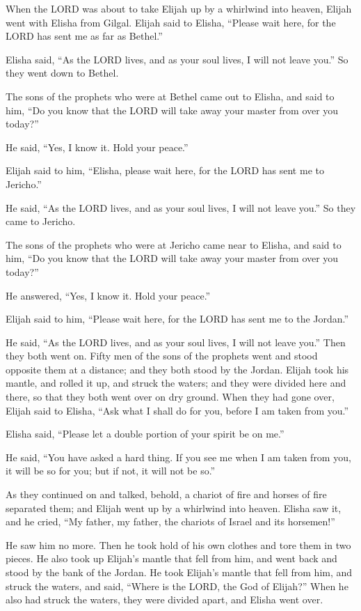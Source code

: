 \mychapter{} \myverse*{}When the LORD was about to take Elijah up by a whirlwind into heaven,
Elijah went with Elisha from Gilgal.
\myverse{}Elijah said to Elisha, “Please wait here, for the LORD has sent me as far as
Bethel.”

Elisha said, “As the LORD lives, and as your soul lives, I will not leave you.” So they went
down to Bethel.

\myverse{}The sons of the prophets who were at Bethel came out to Elisha,
and said to him, “Do you know that the LORD will take away your master from over you today?”

He said, “Yes, I know it. Hold your peace.”

\myverse{}Elijah said to him, “Elisha, please wait here, for the LORD has
sent me to Jericho.”

He said, “As the LORD lives, and as your soul lives, I will not leave you.” So they came
to Jericho.

\myverse{}The sons of the prophets who were at Jericho came near to Elisha,
and said to him, “Do you know that the LORD will take away your master from over you today?”

He answered, “Yes, I know it. Hold your peace.”

\myverse{}Elijah said to him, “Please wait here, for the LORD has sent me
to the Jordan.”

He said, “As the LORD lives, and as your soul lives, I will not leave you.” Then they both
went on.
\myverse{}Fifty men of the sons of the prophets went and stood opposite them at a distance;
and they both stood by the Jordan.
\myverse{}Elijah took his mantle, and rolled it up, and struck the waters; and they were
divided here and there, so that they both went over on dry ground.
\myverse{}When they had gone over, Elijah said to Elisha, “Ask what I shall do for you,
before I am taken from you.”

Elisha said, “Please let a double portion of your spirit be on me.”

\myverse{}He said, “You have asked a hard thing. If you see me when I am
taken from you, it will be so for you; but if not, it will not be so.”

\myverse{}As they continued on and talked, behold, a chariot of fire and
horses of fire separated them; and Elijah went up by a whirlwind into heaven.
\myverse{}Elisha saw it, and he cried, “My father, my father, the chariots of Israel
and its horsemen!”

He saw him no more. Then he took hold of his own clothes and tore them in two pieces.
\myverse{}He also took up Elijah’s mantle that fell from him, and went back and stood
by the bank of the Jordan.
\myverse{}He took Elijah’s mantle that fell from him, and struck the waters, and said,
“Where is the LORD, the God of Elijah?” When he also had struck the waters, they were divided apart, and
Elisha went over.


